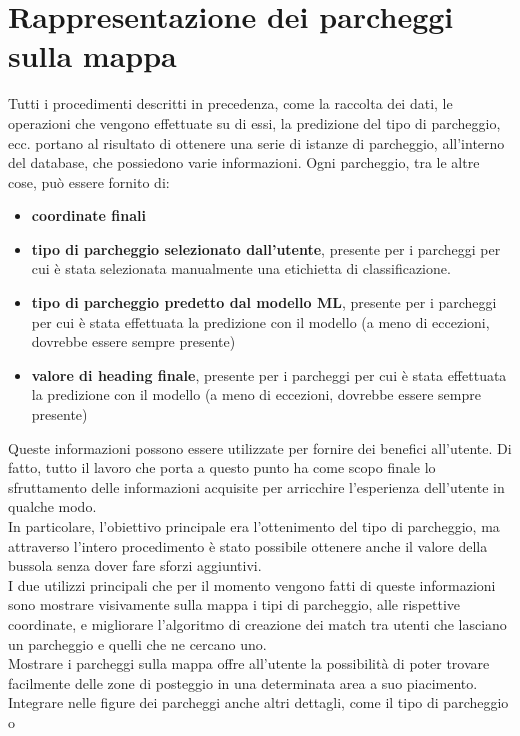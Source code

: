 \chapter{Rappresentazione dei parcheggi sulla mappa}

Tutti i procedimenti descritti in precedenza, come la raccolta dei dati, le
operazioni che vengono effettuate su di essi, la predizione del tipo di 
parcheggio, ecc. portano al risultato di ottenere una serie di istanze
di parcheggio, all'interno del database, che possiedono varie informazioni.
Ogni parcheggio, tra le altre cose, può essere fornito di:
\begin{itemize}
    \item \textbf{coordinate finali}
    \item \textbf{tipo di parcheggio selezionato dall'utente}, presente per i parcheggi
    per cui è stata selezionata manualmente una etichietta di classificazione.
    \item \textbf{tipo di parcheggio predetto dal modello ML}, presente per i parcheggi
    per cui è stata effettuata la predizione con il modello (a meno di eccezioni, dovrebbe
    essere sempre presente)
    \item \textbf{valore di heading finale}, presente per i parcheggi
    per cui è stata effettuata la predizione con il modello (a meno di eccezioni, dovrebbe
    essere sempre presente)
\end{itemize}
Queste informazioni possono essere utilizzate per fornire dei benefici all'utente.
Di fatto, tutto il lavoro che porta a questo punto ha come scopo finale lo 
sfruttamento delle informazioni acquisite per arricchire l'esperienza 
dell'utente in qualche modo.\\
In particolare, l'obiettivo principale era l'ottenimento del tipo di parcheggio, ma 
attraverso l'intero procedimento è stato possibile ottenere anche il valore della 
bussola senza dover fare sforzi aggiuntivi.\\
I due utilizzi principali che per il momento vengono fatti di queste informazioni sono
mostrare visivamente sulla mappa i tipi di parcheggio, alle rispettive coordinate, e
migliorare l'algoritmo di creazione dei match tra utenti che lasciano un parcheggio e 
quelli che ne cercano uno.\\
Mostrare i parcheggi sulla mappa offre all'utente la possibilità di poter trovare 
facilmente delle zone di posteggio in una determinata area a suo piacimento. Integrare
nelle figure dei parcheggi anche altri dettagli, come il tipo di parcheggio o 
